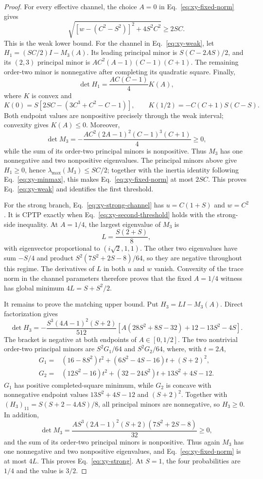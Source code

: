\documentclass[11pt,a4paper]{article}
\theoremstyle{remark}
\begin{document}
\begin{proof}
For every effective channel, the choice $A=0$ in
Eq.~\eqref{eq:xy-fixed-norm} gives
\[
 \sqrt{[w-(C^2-S^2)]^2+4S^2C^2}\geq2SC.
\]
This is the weak lower bound.  For the channel in Eq.~\eqref{eq:xy-weak}, let
$H_1=(SC/2)I-M_3(A)$.  Its leading principal minor is
$S(C-2AS)/2$, and its $(2,3)$ principal minor is
$AC^2(A-1)(C-1)(C+1)$.  The remaining order-two minor is nonnegative after
completing its quadratic square.  Finally,
\[
 \det H_1=\frac{AC(C-1)}4K(A),
\]
where $K$ is convex and
\[
 K(0)=S[2SC-(3C^3+C^2-C-1)],\qquad
 K(1/2)=-C(C+1)S(C-S).
\]
Both endpoint values are nonpositive precisely through the weak interval;
convexity gives $K(A)\leq0$.  Moreover,
\[
 \det M_3=-\frac{AC^2(2A-1)^2(C-1)^3(C+1)}4\geq0,
\]
while the sum of its order-two principal minors is nonpositive.  Thus $M_3$
has one nonnegative and two nonpositive eigenvalues.  The principal minors
above give $H_1\geq0$, hence $\lambda_{\max}(M_3)\leq SC/2$; together with the
inertia identity following Eq.~\eqref{eq:xy-minmax}, this makes
Eq.~\eqref{eq:xy-fixed-norm} at most $2SC$.  This proves
Eq.~\eqref{eq:xy-weak} and identifies the first threshold.

For the strong branch, Eq.~\eqref{eq:xy-strong-channel} has
$u=C(1+S)$ and $w=C^2$.  It is CPTP exactly when
Eq.~\eqref{eq:xy-second-threshold} holds with the strong-side inequality.
At $A=1/4$, the largest eigenvalue of $M_3$ is
\[
 L=\frac{S(2+S)}8,
\]
with eigenvector proportional to $(i\sqrt2,1,1)$.  The other two eigenvalues
have sum $-S/4$ and product
$S^2(7S^2+2S-8)/64$, so they are negative throughout this regime.
The derivatives of $L$ in both $u$ and $w$ vanish.  Convexity of the trace
norm in the channel parameters therefore proves that the fixed
$A=1/4$ witness has global minimum $4L=S+S^2/2$.

It remains to prove the matching upper bound.  Put $H_3=LI-M_3(A)$.  Direct
factorization gives
\[
 \det H_3=-\frac{S^3(4A-1)^2(S+2)}{512}
 \left[A(28S^2+8S-32)+12-13S^2-4S\right].
\]
The bracket is negative at both endpoints of $A\in[0,1/2]$.  The two
nontrivial order-two principal minors are $S^2G_1/64$ and $S^2G_2/64$, where,
with $t=2A$,
\begin{align*}
 G_1={}&(16-8S^2)t^2+(6S^2-4S-16)t+(S+2)^2,\\
 G_2={}&(12S^2-16)t^2+(32-24S^2)t+13S^2+4S-12.
\end{align*}
$G_1$ has positive completed-square minimum, while $G_2$ is concave with
nonnegative endpoint values $13S^2+4S-12$ and $(S+2)^2$.  Together with
$(H_3)_{11}=S(S+2-4AS)/8$, all principal minors are nonnegative, so
$H_3\geq0$.  In addition,
\[
 \det M_3=
 \frac{AS^3(2A-1)^2(S+2)(7S^2+2S-8)}{32}\geq0,
\]
and the sum of its order-two principal minors is nonpositive.  Thus again
$M_3$ has one nonnegative and two nonpositive eigenvalues, and
Eq.~\eqref{eq:xy-fixed-norm} is at most $4L$.  This proves
Eq.~\eqref{eq:xy-strong}.  At $S=1$, the four probabilities are $1/4$ and the
value is $3/2$.
\end{proof}
\end{document}
